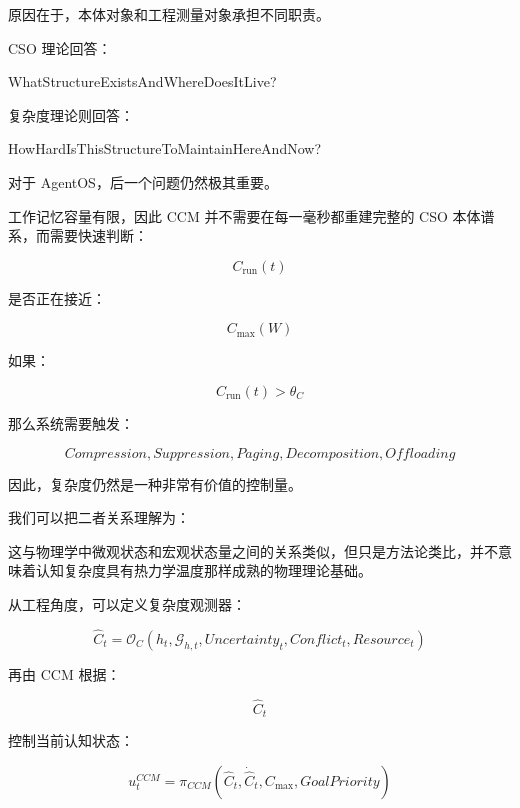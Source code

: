 原因在于，本体对象和工程测量对象承担不同职责。

CSO 理论回答：

\begin{statementbox}
WhatStructureExistsAndWhereDoesItLive?
\end{statementbox}

复杂度理论则回答：

\begin{statementbox}
HowHardIsThisStructureToMaintainHereAndNow?
\end{statementbox}

对于 AgentOS，后一个问题仍然极其重要。

工作记忆容量有限，因此 CCM 并不需要在每一毫秒都重建完整的 CSO 本体谱系，而需要快速判断：

\[
C_{\mathrm{run}}(t)
\]

是否正在接近：

\[
C_{\max}(W)
\]

如果：

\[
C_{\mathrm{run}}(t)
>
\theta_C
\]

那么系统需要触发：

\[
Compression,
Suppression,
Paging,
Decomposition,
Offloading
\]

因此，复杂度仍然是一种非常有价值的控制量。

我们可以把二者关系理解为：

\begin{statementbox}
\centering
{}
\end{statementbox}

\begin{statementbox}
\centering
{}
\end{statementbox}

这与物理学中微观状态和宏观状态量之间的关系类似，但只是方法论类比，并不意味着认知复杂度具有热力学温度那样成熟的物理理论基础。

从工程角度，可以定义复杂度观测器：

\[
\hat C_t
=
\mathcal O_C(
h_t,
\mathcal G_{h,t},
Uncertainty_t,
Conflict_t,
Resource_t
)
\]

再由 CCM 根据：

\[
\hat C_t
\]

控制当前认知状态：

\[
u_t^{CCM}
=
\pi_{CCM}(
\hat C_t,
\dot{\hat C}_t,
C_{\max},
GoalPriority
)
\]

